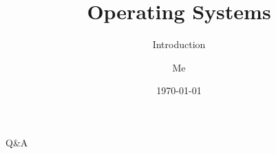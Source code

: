 \documentclass[12pt]{beamer}
\title{Operating Systems}
\subtitle{Introduction}
\author{Me}
\date{\today}
\begin{document}
  \begin{frame}
    \titlepage
  \end{frame}
  
  
  \begin{frame}
  \begin{center}
  \Huge Q\&A
  \end{center}
  \end{frame}
\end{document}
